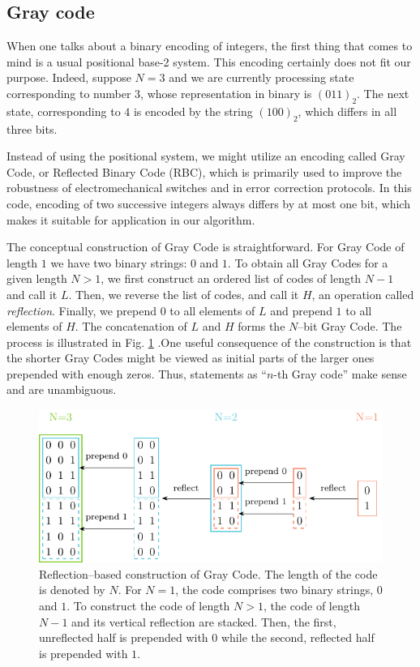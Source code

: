\subsection{Gray code}
When one talks about a binary encoding of integers, the first thing that comes
to mind is a usual positional base-2 system. This encoding certainly does not
fit our purpose. Indeed, suppose $N=3$ and we are currently processing state
corresponding to number $3$, whose representation in binary is $(011)_{2}$. The
next state, corresponding to $4$ is encoded by the string $(100)_{2}$, which
differs in all three bits.

Instead of using the positional system, we might utilize an encoding called
Gray Code, or Reflected Binary Code (RBC), which is primarily used to improve
the robustness of electromechanical switches and in error correction protocols.
In this code, encoding of two successive integers always differs by at most one
bit, which makes it suitable for application in our algorithm.

The conceptual construction of Gray Code is straightforward. For Gray Code of
length $1$ we have two binary strings: $0$ and $1$. To obtain all Gray Codes
for a given length $N > 1$, we first construct an ordered list of codes of
length $N-1$ and call it $L$. Then, we reverse the list of codes, and call it
$H$, an operation called \emph{reflection}. Finally, we prepend $0$ to all
elements of $L$ and prepend $1$ to all elements of $H$. The concatenation of
$L$ and $H$ forms the $N$--bit Gray Code. The process is illustrated in Fig.
\ref{fig:gray} .One useful consequence of the construction is that the shorter
Gray Codes might be viewed as initial parts of the larger ones prepended with
enough zeros. Thus, statements as ``$n$-th Gray code'' make sense and are
unambiguous.

\begin{figure}
  \includegraphics[width=\textwidth]{figures/gray.pdf}
  \caption{Reflection--based construction of Gray Code. The length of the code is denoted by $N$. For $N=1$, the code comprises two binary strings, $0$ and $1$. To construct the code of length $N>1$, the code of length $N-1$ and its vertical reflection are stacked. Then, the first, unreflected half is prepended with $0$ while the second, reflected half is prepended with $1$.}
  \label{fig:gray}
\end{figure}

